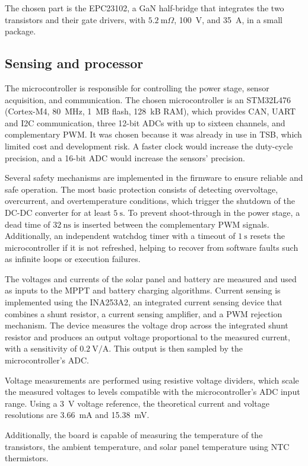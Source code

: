 \documentclass[conference]{IEEEtran}
\begin{document}
    The chosen part is the EPC23102, a GaN half-bridge that integrates the two transistors and their gate drivers, with $5.2~\mathrm{m}\Omega$, 100~V, and 35~A, in a small package. 

    \subsection{Sensing and processor}
    The microcontroller is responsible for controlling the power stage, sensor acquisition, and communication. The chosen microcontroller is an STM32L476 (Cortex-M4, 80~MHz, 1~MB flash, 128~kB RAM), which provides CAN, UART and I2C communication, three 12-bit ADCs with up to sixteen channels, and complementary PWM. It was chosen because it was already in use in TSB, which limited cost and development risk. A faster clock would increase the duty-cycle precision, and a 16-bit ADC would increase the sensors' precision.

    Several safety mechanisms are implemented in the firmware to ensure reliable and safe operation. The most basic protection consists of detecting overvoltage, overcurrent, and overtemperature conditions, which trigger the shutdown of the DC-DC converter for at least $5~\mathrm{s}$. To prevent shoot-through in the power stage, a dead time of $32~\mathrm{ns}$ is inserted between the complementary PWM signals. Additionally, an independent watchdog timer with a timeout of $1~\mathrm{s}$ resets the microcontroller if it is not refreshed, helping to recover from software faults such as infinite loops or execution failures.

    The voltages and currents of the solar panel and battery are measured and used as inputs to the MPPT and battery charging algorithms. Current sensing is implemented using the INA253A2, an integrated current sensing device that combines a shunt resistor, a current sensing amplifier, and a PWM rejection mechanism. The device measures the voltage drop across the integrated shunt resistor and produces an output voltage proportional to the measured current, with a sensitivity of $0.2~\mathrm{V/A}$. This output is then sampled by the microcontroller's ADC.

    Voltage measurements are performed using resistive voltage dividers, which scale the measured voltages to levels compatible with the microcontroller's ADC input range. Using a 3~V voltage reference, the theoretical current and voltage resolutions are 3.66~mA and 15.38~mV.

    Additionally, the board is capable of measuring the temperature of the transistors, the ambient temperature, and solar panel temperature using NTC thermistors. 
\end{document}

